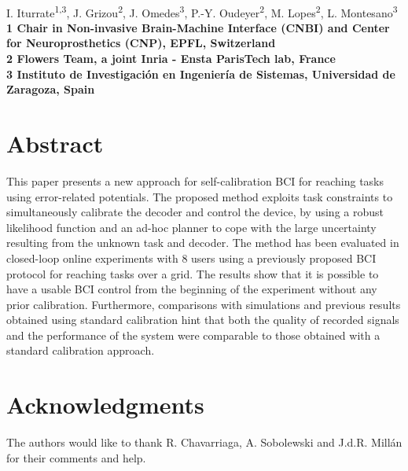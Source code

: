 \documentclass[10pt,letterpaper]{article}
\date{}
\begin{document}
\vspace*{0.35in}


\begin{flushleft}
{\Large
\textbf{}
}
\newline
\\
I. Iturrate\textsuperscript{1,3}, J. Grizou\textsuperscript{2}, J. Omedes\textsuperscript{3}, P.-Y. Oudeyer\textsuperscript{2}, M. Lopes\textsuperscript{2}, L. Montesano\textsuperscript{3}
\\
\bf{1} Chair in Non-invasive Brain-Machine Interface (CNBI) and Center for Neuroprosthetics (CNP), EPFL, Switzerland
\\
\bf{2} Flowers Team, a joint Inria - Ensta ParisTech lab, France
\\
\bf{3} Instituto de Investigaci\'{o}n en Ingenier\'{i}a de Sistemas, Universidad de Zaragoza, Spain
\\

\end{flushleft}

\section*{Abstract}
This paper presents a new approach for self-calibration BCI for reaching tasks using error-related potentials. The proposed method exploits task constraints to simultaneously calibrate the decoder and control the device, by using a robust likelihood function and an ad-hoc planner to cope with the large uncertainty resulting from the unknown task and decoder. The method has been evaluated in closed-loop online experiments with 8 users using a previously proposed BCI protocol for reaching tasks over a grid. The results show that it is possible to have a usable BCI control from the beginning of the experiment without any prior calibration. Furthermore, comparisons with simulations and previous results obtained using standard calibration hint that both the quality of recorded signals and the performance of the system were comparable to those obtained with a standard calibration approach. 



\linenumbers



%


	




%

\section*{Acknowledgments}
The authors would like to thank R. Chavarriaga, A. Sobolewski and J.d.R. Mill\'{a}n for their comments and help.
\end{document}
